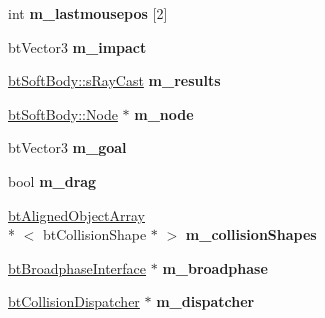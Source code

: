 \begin{DoxyCompactItemize}
\item 
\hypertarget{class_soft_demo_ad7ca30d7f02d25f88e68da4a7fb822ae}{int {\bfseries m\+\_\+lastmousepos} \mbox{[}2\mbox{]}}\label{class_soft_demo_ad7ca30d7f02d25f88e68da4a7fb822ae}

\item 
\hypertarget{class_soft_demo_abb67e5531997ab104684cd9f19301697}{bt\+Vector3 {\bfseries m\+\_\+impact}}\label{class_soft_demo_abb67e5531997ab104684cd9f19301697}

\item 
\hypertarget{class_soft_demo_af50cf744972f56305f3dea6c3e47b0fb}{\hyperlink{structbt_soft_body_1_1s_ray_cast}{bt\+Soft\+Body\+::s\+Ray\+Cast} {\bfseries m\+\_\+results}}\label{class_soft_demo_af50cf744972f56305f3dea6c3e47b0fb}

\item 
\hypertarget{class_soft_demo_ac1356777cc495ff62920e93814dd47f2}{\hyperlink{structbt_soft_body_1_1_node}{bt\+Soft\+Body\+::\+Node} $\ast$ {\bfseries m\+\_\+node}}\label{class_soft_demo_ac1356777cc495ff62920e93814dd47f2}

\item 
\hypertarget{class_soft_demo_ab7b41ff34afb70e8e84c9178112e320e}{bt\+Vector3 {\bfseries m\+\_\+goal}}\label{class_soft_demo_ab7b41ff34afb70e8e84c9178112e320e}

\item 
\hypertarget{class_soft_demo_af8da3fdc8f6e28892dde117aa952e552}{bool {\bfseries m\+\_\+drag}}\label{class_soft_demo_af8da3fdc8f6e28892dde117aa952e552}

\item 
\hypertarget{class_soft_demo_a6c61c70e3e55566e7f83bce6ae612910}{\hyperlink{classbt_aligned_object_array}{bt\+Aligned\+Object\+Array}\\*
$<$ bt\+Collision\+Shape $\ast$ $>$ {\bfseries m\+\_\+collision\+Shapes}}\label{class_soft_demo_a6c61c70e3e55566e7f83bce6ae612910}

\item 
\hypertarget{class_soft_demo_ac3606ceb5b81c7968e1287ee883dc85f}{\hyperlink{classbt_broadphase_interface}{bt\+Broadphase\+Interface} $\ast$ {\bfseries m\+\_\+broadphase}}\label{class_soft_demo_ac3606ceb5b81c7968e1287ee883dc85f}

\item 
\hypertarget{class_soft_demo_af840a10b2f125087355f67edf3124122}{\hyperlink{classbt_collision_dispatcher}{bt\+Collision\+Dispatcher} $\ast$ {\bfseries m\+\_\+dispatcher}}\label{class_soft_demo_af840a10b2f125087355f67edf3124122}


\end{DoxyCompactItemize}
